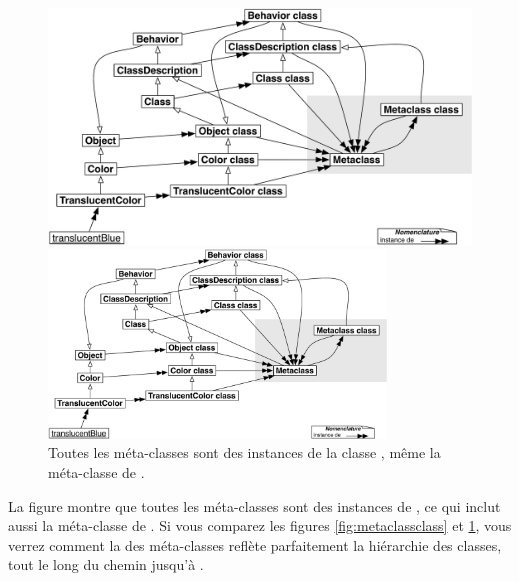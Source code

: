 \documentclass[a4paper,10pt,twoside]{book}
\begin{document}
\begin{center}
\begin{figure}
\ifluluelse
	{\centerline{\includegraphics[width=\textwidth]{TranslucentMetaclassClassClass}}}
	{\centerline{\includegraphics[width=0.8\textwidth]{TranslucentMetaclassClassClass}}}
\caption{Toutes les méta-classes sont des instances de la classe ,  même la méta-classe de . \label{fig:metaclassclassclass}}
\end{figure}
\end{center}

La figure montre que toutes les méta-classes sont des instances de , ce qui inclut aussi la méta-classe de .
Si vous comparez les figures \ref{fig:metaclassclass} et \ref{fig:metaclassclassclass}, vous verrez comment la  des méta-classes reflète parfaitement la hiérarchie des classes, tout le long du chemin jusqu'à .
\end{document}
